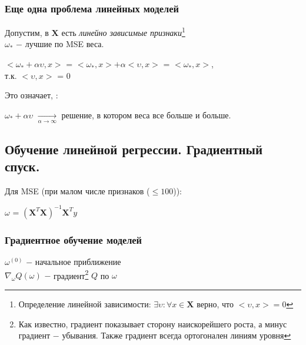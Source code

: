         \subsubsection{Еще одна проблема линейных моделей}
            Допустим, в $\mathbf{X}$ есть \textit{линейно зависимые признаки}\footnote{Определение линейной зависимости: $\exists \upsilon : \forall x \in \mathbf{X}$ верно, что $<\upsilon, x> = 0$}\\
            $\omega_*$ $-$ лучшие по MSE веса.\\
            \begin{center}
                $<\omega_* + \alpha\upsilon, x>$ = $ <\omega_*, x> + \alpha<\upsilon, x> $ = $<\omega_*, x>$, \\
                т.к. $<\upsilon, x>$ = $0 $
            \end{center}
            Это означает, :\\
            \begin{center}
                $\omega_* + \alpha\upsilon$ $\longrightarrow\limits_{\alpha \rightarrow \infty}$ решение, в котором веса все больше и больше.
            \end{center}

        \subsection{Обучение линейной регрессии. Градиентный спуск.}

            Для MSE (при малом числе признаков ($\leq 100$)): 
            \begin{center}
                $\omega$ = $(\mathbf{X}^T\mathbf{X})^{-1}\mathbf{X}^Ty$
            \end{center}

            \subsubsection{Градиентное обучение моделей}
            $\omega^{(0)}$ $-$ начальное приближение\\
            
            $\nabla_\omega Q(\omega)$ $-$ градиент\footnote{Как известно, градиент показывает сторону наискорейшего роста, а минус градиент $-$ убывания. Также градиент всегда ортогонален линиям уровня} $Q$ по $\omega$

